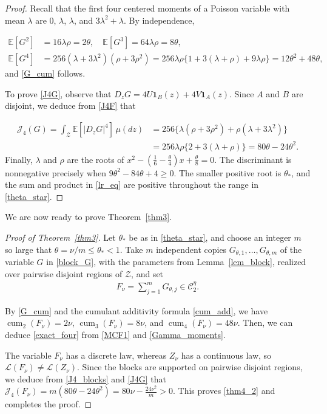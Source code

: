 \documentclass[letterpaper,11pt,reqno]{amsart}
\numberwithin{equation}{section}
\theoremstyle{plain}
\theoremstyle{definition}
\theoremstyle{remark}
\newcommand{\E}{\mathbb{E}}
\newcommand{\ind}{\mathbf{1}}
\newcommand{\cC}{\mathcal{C}}
\newcommand{\cL}{\mathcal{L}}
\newcommand{\cZ}{\mathcal{Z}}
\DeclareMathOperator{\cum}{cum}
\newcommand{\noi}{\noindent}
\newcommand{\dd}{d}
\newcommand{\Jfour}{\mathcal J_4}
\begin{document}
\begin{proof}
Recall that the first four centered moments of a Poisson variable
with mean $\lambda$ are $0$, $\lambda$, $\lambda$, and
$3\lambda^2+\lambda$.  By independence,

\noi
\begin{align*}
 \E[G^2]&=16\lambda\rho=2\theta,
 \quad \E[G^3]=64\lambda\rho=8\theta,\\
 \E[G^4]
 &=256(\lambda+3\lambda^2)
 (\rho+3\rho^2)
 =256\lambda\rho
 \{1+3(\lambda+\rho)+9\lambda\rho\}
 =12\theta^2+48\theta,
\end{align*}
and \eqref{G_cum} follows.


To prove \eqref{J4G}, observe that
$D_zG=4U\ind_B(z)+4V\ind_A(z)$.  Since $A$ and $B$ are disjoint,
we deduce from \eqref{J4F} that

\noi
\begin{align*}
 \Jfour(G)
 =\int_{\cZ}\E[|D_zG|^4]\,\mu(\dd z)
 &=256\{\lambda(\rho+3\rho^2)
 +\rho(\lambda+3\lambda^2)\}\\
 &=256\lambda\rho\{2+3(\lambda+\rho)\}
 =80\theta-24\theta^2.
\end{align*}
Finally, $\lambda$ and $\rho$ are the roots of
$ x^2- (\frac16-\frac\theta4 )x
 +\frac\theta8=0.$
The discriminant is nonnegative precisely when
$9\theta^2-84\theta+4\geq0$.
The smaller positive root is $\theta_\ast$, and the sum and product in
\eqref{lr_eq} are positive throughout the range in
\eqref{theta_star}.
\end{proof}

We are now ready to prove Theorem~\ref{thm3}.

\begin{proof}[Proof of Theorem~\ref{thm3}]
Let $\theta_\ast$ be as in \eqref{theta_star}, and choose an
integer $m$ so large that $\theta=\nu/m\leq\theta_\ast<1$.
Take $m$ independent copies $G_{\theta,1},\ldots,G_{\theta,m}$ of
the variable $G$ in \eqref{block_G}, with the parameters from
Lemma~\ref{lem_block}, realized over pairwise disjoint regions of
$\cZ$, and set
\noi
\begin{align*}
 F_\nu=\sum_{j=1}^mG_{\theta,j} \in \cC_2^\eta.
\end{align*}


By \eqref{G_cum} and the cumulant additivity formula
\eqref{cum_add},
we have 
$ \cum_2(F_\nu)=2\nu$,
$ \cum_3(F_\nu)=8\nu$,
and
$ \cum_4(F_\nu)=48\nu.$
Then, we can deduce  \eqref{exact_four}  from  \eqref{MCF1} and
\eqref{Gamma_moments}.


The variable $F_\nu$ has a discrete law, whereas $Z_\nu$ has a
continuous law, so $\cL(F_\nu)\neq\cL(Z_\nu)$.  Since the blocks are
supported on pairwise disjoint regions, we deduce from
\eqref{J4_blocks} and \eqref{J4G} that
$ \Jfour(F_\nu)
 =m(80\theta-24\theta^2)
 =80\nu-\frac{24\nu^2}{m}>0.
$
This proves \eqref{thm4_2} and completes the proof.
\end{proof}
\end{document}
